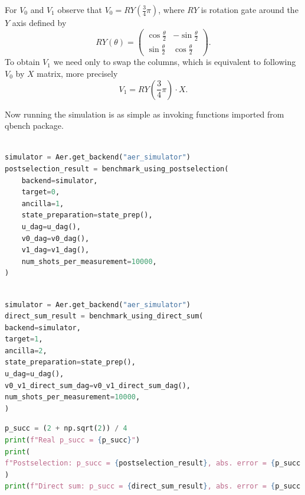 \documentclass[preprint,12pt, a4paper, dvipsnames]{elsarticle}
\newcommand{\1}{{\rm 1\hspace{-0.9mm}l}}
\begin{document}
For $V_0$ and $V_1$ observe that $V_0 = RY\left(\frac{3}{4} \pi \right) $, where $RY$ is rotation gate around the $Y$ axis defined by
\begin{equation}
RY(\theta) =
\left(\begin{array}{cc} \cos\frac{\theta}{2} & -\sin\frac{\theta}{2} \\ \sin\frac{\theta}{2} & \cos\frac{\theta}{2} \end{array}\right).
\end{equation}
To obtain $V_1$  we need only to swap the columns, which is equivalent to following $V_0$ by $X$ matrix, more precisely
\begin{equation}
V_1 =  RY\left(\frac{3}{4} \pi \right) \cdot X.
\end{equation}

Now running the simulation is as simple as invoking functions imported from qbench package.

\begin{lstlisting}[language=Python, caption=Simulation benchmark by using postselection]

simulator = Aer.get_backend("aer_simulator")
postselection_result = benchmark_using_postselection(
	backend=simulator,
	target=0,
	ancilla=1,
	state_preparation=state_prep(),
	u_dag=u_dag(),
	v0_dag=v0_dag(),
	v1_dag=v1_dag(),
	num_shots_per_measurement=10000,
)
\end{lstlisting}


\begin{lstlisting}[language=Python, caption=Simulation benchmark by using direct sum]

simulator = Aer.get_backend("aer_simulator")
direct_sum_result = benchmark_using_direct_sum(
backend=simulator,
target=1,
ancilla=2,
state_preparation=state_prep(),
u_dag=u_dag(),
v0_v1_direct_sum_dag=v0_v1_direct_sum_dag(),
num_shots_per_measurement=10000,
)
\end{lstlisting}

\begin{lstlisting}[language=Python, caption=Computation of probability]
p_succ = (2 + np.sqrt(2)) / 4
print(f"Real p_succ = {p_succ}")
print(
f"Postselection: p_succ = {postselection_result}, abs. error = {p_succ - postselection_result}"
)
print(f"Direct sum: p_succ = {direct_sum_result}, abs. error = {p_succ - direct_sum_result}")

\end{lstlisting}
\end{document}
